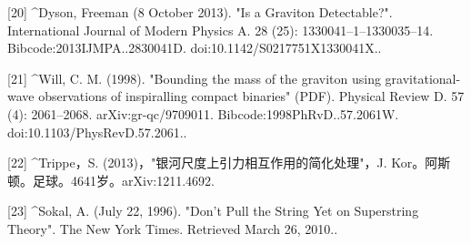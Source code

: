 [20]
^Dyson, Freeman (8 October 2013). "Is a Graviton Detectable?". International Journal of Modern Physics A. 28 (25): 1330041–1–1330035–14. Bibcode:2013IJMPA..2830041D. doi:10.1142/S0217751X1330041X..

[21]
^Will, C. M. (1998). "Bounding the mass of the graviton using gravitational-wave observations of inspiralling compact binaries" (PDF). Physical Review D. 57 (4): 2061–2068. arXiv:gr-qc/9709011. Bibcode:1998PhRvD..57.2061W. doi:10.1103/PhysRevD.57.2061..

[22]
^Trippe，S. (2013)，"银河尺度上引力相互作用的简化处理"，J. Kor。阿斯顿。足球。4641岁。arXiv:1211.4692.

[23]
^Sokal, A. (July 22, 1996). "Don't Pull the String Yet on Superstring Theory". The New York Times. Retrieved March 26, 2010..